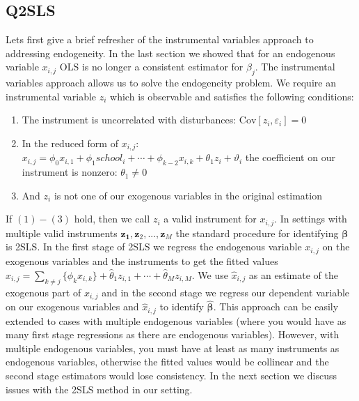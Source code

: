 \documentclass[12pt]{article}
\newcommand{\Cov}{\mathrm{Cov}}
\begin{document}
\subsection{Q2SLS}
Lets first give a brief refresher of the instrumental variables approach to addressing endogeneity. In the last section we showed that for an endogenous variable $x_{i,j}$ OLS is no longer a consistent estimator for $\beta_j$. The instrumental variables approach allows us to solve the endogeneity problem. We require an instrumental variable $z_i$ which is observable and satisfies the following conditions:
\begin{spacing}{1}
\begin{enumerate}[label={(\arabic*)}]
	\item The instrument is uncorrelated with disturbances: $\Cov[z_i, \varepsilon_i] = 0$ \
	\item In the reduced form of $x_{i,j}$: $x_{i,j} = \phi_0 x_{i,1} + \phi_1 school_i + \cdots + \phi_{k-2}x_{i,k} + \theta_1 z_i + \vartheta_i$ the coefficient on our instrument is nonzero: $\theta_1 \ne 0$
	\item And $z_i$ is not one of our exogenous variables in the original estimation
\end{enumerate}
\end{spacing}
\noindent If $(1)-(3)$ hold, then we call $z_i$ a valid instrument for $x_{i,j}$. In settings with multiple valid instruments $\bm{z_1}, \bm{z}_2, ..., \bm{z}_M$ the standard procedure for identifying $\bm{\beta}$ is 2SLS. In the first stage of 2SLS we regress the endogenous variable $x_{i,j}$ on the exogenous variables and the instruments to get the fitted values $\hat{x}_{i,j} =  \sum_{k \ne j}\{\hat{\phi}_k x_{i,k}\} + \hat{\theta}_1 z_{i,1} + \cdots + \hat{\theta}_M z_{i,M}$. We use $\hat{x}_{i,j}$ as an estimate of the exogenous part of $x_{i,j}$ and in the second stage we regress our dependent variable on our exogenous variables and $\hat{x}_{i,j}$ to identify $\hat{\bm{\beta}}$. This approach can be easily extended to cases with multiple endogenous variables (where you would have as many first stage regressions as there are endogenous variables). However, with multiple endogenous variables, you must have at least as many instruments as endogenous variables, otherwise the fitted values would be collinear and the second stage estimators would lose consistency. In the next section we discuss issues with the 2SLS method in our setting.

\end{document}
